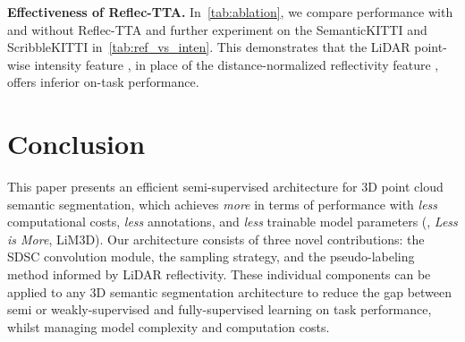 \documentclass[10pt,twocolumn,letterpaper]{article}
\newcommand\bdtitle[1]{\noindent\textbf{#1}}
\begin{document}
\bdtitle{Effectiveness of Reflec-TTA.} In~\cref{tab:ablation}, we compare {\ourmodel} performance with and without Reflec-TTA and further experiment on the SemanticKITTI and ScribbleKITTI {\validset} in~\cref{tab:ref_vs_inten}. This demonstrates that the LiDAR point-wise intensity feature , in place of the distance-normalized reflectivity feature , offers inferior on-task performance. 


 \vspace{-0.2cm}   
\section{Conclusion}
\vspace{-0.2cm}  
\label{sec:conclusion}

\noindent
This paper presents an efficient semi-supervised architecture for 3D point cloud semantic segmentation, which achieves \textit{more} in terms of performance with \textit{less} computational costs, \textit{less} annotations, and \textit{less} trainable model parameters (\ie, \textit{Less is More}, LiM3D). Our architecture consists of three novel contributions: the SDSC convolution module,  the {\samplshort} sampling strategy, and the pseudo-labeling method informed by LiDAR reflectivity. These individual components can be applied to any 3D semantic segmentation architecture to reduce the gap between semi or weakly-supervised and fully-supervised learning on task performance, whilst managing model complexity and computation costs. 




 

\clearpage
{\small


}
\end{document}
